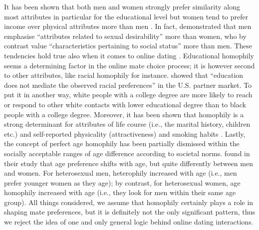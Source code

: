 It has been shown that both men and women strongly prefer similarity
along most attributes \textendash{} in particular for the educational
level \citep{Blossfeld2009Educational-Ass} \textendash{} but women
tend to prefer income over physical attributes more than men \citep{Hitsch2010What-Makes-You-}.
In fact, \citet{Regan2000Partner-Prefere} demonstrated that men emphasise
\textquotedblleft attributes related to sexual desirability\textquotedblright{}
more than women, who by contrast value \textquotedblleft characteristics
pertaining to social status\textquotedblright{} more than men. These
tendencies hold true also when it comes to online dating \citep{Abramova2016Gender-Differen}.
Educational homophily seems a determining factor in the online mate
choice process; it is however second to other attributes, like racial
homophily for instance. \citet{Lin2013Mate-Selection-} showed that
\textquotedblleft education does not mediate the observed racial preferences\textquotedblright{}
in the U.S. partner market. To put it in another way, white people
with a college degree are more likely to reach or respond to other
white contacts with lower educational degree than to black people
with a college degree. Moreover, it has been shown that homophily
is a strong determinant for attributes of life course (i.e., the marital
history, children etc.) and self-reported physicality (attractiveness)
and smoking habits \citep{Fiore2005Homophily-in-On,Fiore2004Romantic-Regres}.
Lastly, the concept of perfect age homophily has been partially dismissed
\textendash{} within the socially acceptable ranges of age difference
according to societal norms. \citet{Skopek2011The-gendered-dy} found
in their study that age preference shifts with age, but quite differently
between men and women. For heterosexual men, heterophily increased
with age (i.e., men prefer younger women as they age); by contrast,
for heterosexual women, age homophily increased with age (i.e., they
look for men within their same age group). All things considered,
we assume that homophily certainly plays a role in shaping mate preferences,
but it is definitely not the only significant pattern, thus we reject
the idea of one and only general logic behind online dating interactions.

